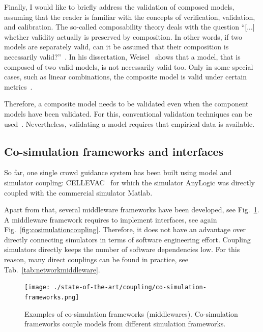 Finally, I would like to briefly address the validation of composed models, assuming that the reader is familiar with the concepts of verification, validation, and calibration.  
The so-called composability theory deals with the question \enquote{[...] whether validity actually is preserved by composition. In other words, if two models are separately valid, can it be assumed that their composition is necessarily valid?}~\cite[p.63]{zhang-2019-cs}.
In his dissertation, Weisel~\cite{weisel-2004-cs} shows that a model, that is composed of two valid models, is not necessarily valid too. Only in some special cases, such as linear combinations, the composite model is valid under certain metrics~\cite{weisel-2004-cs}. 


Therefore, a composite model needs to be validated even when the component models have been validated. For this, conventional validation techniques can be used~\cite[p.76]{zhang-2019-cs}. Nevertheless, validating a model requires that empirical data is available. 



\subsection{Co-simulation frameworks and interfaces}
So far, one single crowd guidance system has been built using model and simulator coupling: CELLEVAC~\cite{lopez-2021-cdyn} for which the simulator AnyLogic was directly coupled with the commercial simulator Matlab. 

Apart from that, several middleware frameworks have been developed, see Fig.~\ref{fig:overviewcosimulation}. A middleware framework requires  to implement interfaces, see again Fig.~\ref{fig:cosimulationcoupling}. Therefore, it does not have an advantage over directly connecting simulators in terms of software engineering effort. Coupling simulators directly keeps the number of software dependencies low. For this reason, many direct couplings can be found in practice, see Tab.~\ref{tab:networkmiddleware}.


\begin{figure}[H]
\hspace*{-2cm}
\texttt{[image: ./state-of-the-art/coupling/co-simulation-frameworks.png]} 
\hspace*{2cm}
\caption[Overview on co-simulation frameworks]{Examples of co-simulation frameworks (middlewares). Co-simulation frameworks couple models from different simulation frameworks.
}
\label{fig:overviewcosimulation}
\end{figure}








